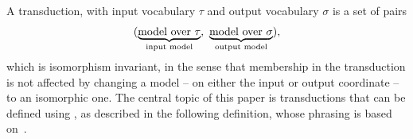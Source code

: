  A transduction, with input vocabulary $\tau$ and output vocabulary $\sigma$ is a set of pairs 
\begin{align*}
    (\myunderbrace{\text{model over $\tau$}}{input model}, \ 
    \myunderbrace{\text{model over $\sigma$}}{output model}),
\end{align*}
which is isomorphism invariant, in the sense that membership in the transduction is not affected by changing a model -- on either the input or output coordinate -- to an isomorphic one. The central topic of this paper is transductions that can be defined using \mso, as described in the following definition, whose phrasing is based on~\cite[p.~9--10]{bojanczykOptimizingTreeDecompositions2017a}. 

